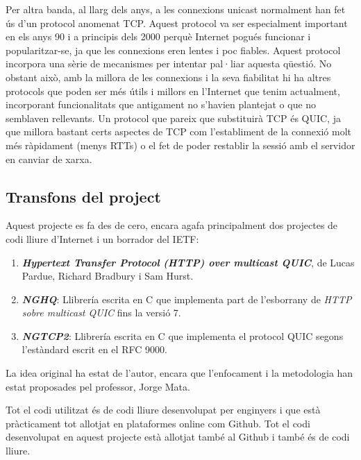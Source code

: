 {    Per altra banda, al llarg dels anys, a les connexions unicast normalment han fet ús d'un protocol anomenat \ac{TCP}. Aquest protocol va ser especialment
    important en els anys 90 i a principis dels 2000 perquè Internet pogués funcionar i popularitzar-se, ja que les connexions eren lentes i poc fiables.
    Aquest protocol incorpora una sèrie de mecanismes per intentar pal·liar aquesta qüestió. No obstant això, amb la millora de les connexions i la seva fiabilitat
    hi ha altres protocols que poden ser més útils i millors en l'Internet que tenim actualment, incorporant funcionalitats que antigament no s'havien plantejat
    o que no semblaven rellevants. Un protocol que pareix que substituirà \ac{TCP} és QUIC, ja que millora bastant certs aspectes de TCP com l'establiment
    de la connexió molt més ràpidament (menys RTTs) o el fet de poder restablir la sessió amb el servidor en canviar de xarxa.
    
}

\subsection{Transfons del project}
{
    Aquest projecte es fa des de cero, encara agafa principalment dos projectes de codi lliure d'Internet i un borrador del \ac{IETF}:

    \begin{enumerate}
        \item{\textbf{\textit{Hypertext Transfer Protocol (\ac{HTTP}) over multicast QUIC}}, de Lucas Pardue, Richard Bradbury i Sam Hurst.}
        \item{\textbf{\textit{NGHQ}}: Llibrería escrita en C que implementa part de l'esborrany de \textit{\ac{HTTP} sobre multicast QUIC} fins la versió 7.}
        \item{\textbf{\textit{NGTCP2}}: Llibrería escrita en C que implementa el protocol QUIC segons l'estàndard escrit en el \ac{RFC} 9000.}
    \end{enumerate}

    La idea original ha estat de l'autor, encara que l'enfocament i la metodologia han estat proposades pel professor, Jorge Mata.

    Tot el codi utilitzat és de codi lliure desenvolupat per enginyers i que està pràcticament tot allotjat en plataformes
    online com Github. Tot el codi desenvolupat en aquest projecte està allotjat també al Github i també és de codi lliure.
}

